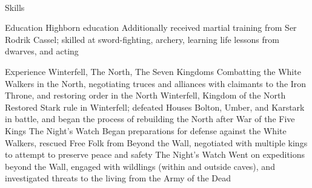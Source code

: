 \documentclass[]{resume-rajatscode}
\begin{document}



\begin{subheader}{1}
    \\
\end{subheader}

\begin{topic}{Skills}
    \\ %
\end{topic}

\begin{topic}{Education}
    {Highborn education}
    {Additionally received martial training from Ser Rodrik Cassel; skilled
    at sword-fighting, archery, learning life lessons from dwarves, and acting}
\end{topic}

\begin{topic}{Experience}
    {Winterfell, The North, The Seven Kingdoms}
    {Combatting the White Walkers in the North, negotiating truces and
    alliances with claimants to the Iron Throne, and restoring order in the
    North}
    {Winterfell, Kingdom of the North}
    {Restored Stark rule in Winterfell; defeated Houses Bolton, Umber, and
    Karstark in battle, and began the process of rebuilding the North after
    War of the Five Kings}
    {The Night's Watch}
    {Began preparations for defense against the White Walkers, rescued
    Free Folk from Beyond the Wall, negotiated with multiple kings to
    attempt to preserve peace and safety}
    {The Night's Watch}
    {Went on expeditions beyond the Wall, engaged with wildlings (within
    and outside caves), and investigated threats to the living from the Army
    of the Dead}
\end{topic}
\end{document}
